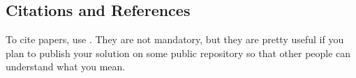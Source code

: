 \documentclass{article}
\begin{document}
\subsection{Citations and References}
To cite papers, use \cite{Samuel59}. They are not mandatory, but they are pretty useful if you plan to publish your solution on some public repository so that other people can understand what you mean.

\nocite{langley00}



\end{document}
